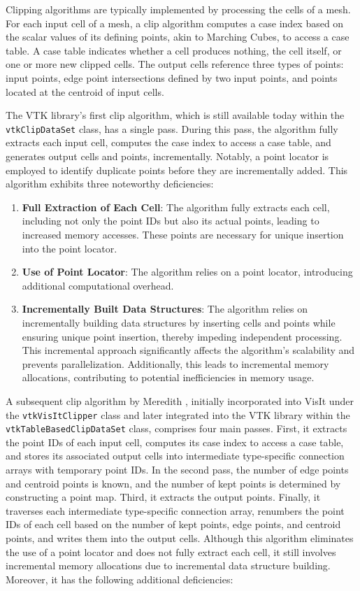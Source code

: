\documentclass{egpubl}
\begin{document}
Clipping algorithms are typically implemented by processing the cells of a mesh. For each input cell of a mesh, a clip algorithm computes a case index based on the scalar values of its defining points, akin to Marching Cubes, to access a case table. A case table indicates whether a cell produces nothing, the cell itself, or one or more new clipped cells. The output cells reference three types of points: input points, edge point intersections defined by two input points, and points located at the centroid of input cells.

The VTK library's \cite{VTK} first clip algorithm, which is still available today within the \texttt{vtkClipDataSet} class, has a single pass. During this pass, the algorithm fully extracts each input cell, computes the case index to access a case table, and generates output cells and points, incrementally. Notably, a point locator is employed to identify duplicate points before they are incrementally added. This algorithm exhibits three noteworthy deficiencies:

\begin{enumerate}
    \item \textbf{Full Extraction of Each Cell}: The algorithm fully extracts each cell, including not only the point IDs but also its actual points, leading to increased memory accesses. These points are necessary for unique insertion into the point locator.
    \item \textbf{Use of Point Locator}: The algorithm relies on a point locator, introducing additional computational overhead.
    \item \textbf{Incrementally Built Data Structures}: The algorithm relies on incrementally building data structures by inserting cells and points while ensuring unique point insertion, thereby impeding independent processing. This incremental approach significantly affects the algorithm's scalability and prevents parallelization. Additionally, this leads to incremental memory allocations, contributing to potential inefficiencies in memory usage.
\end{enumerate}

A subsequent clip algorithm by Meredith \cite{Clip}, initially incorporated into VisIt \cite{VisIt} under the \texttt{vtkVisItClipper} class and later integrated into the VTK library within the \texttt{vtkTableBasedClipDataSet} class, comprises four main passes.
First, it extracts the point IDs of each input cell, computes its case index to access a case table, and stores its associated output cells into intermediate type-specific connection arrays with temporary point IDs. In the second pass, the number of edge points and centroid points is known, and the number of kept points is determined by constructing a point map. Third, it extracts the output points. Finally, it traverses each intermediate type-specific connection array, renumbers the point IDs of each cell based on the number of kept points, edge points, and centroid points, and writes them into the output cells. Although this algorithm eliminates the use of a point locator and does not fully extract each cell, it still involves incremental memory allocations due to incremental data structure building. Moreover, it has the following additional deficiencies:
\end{document}

